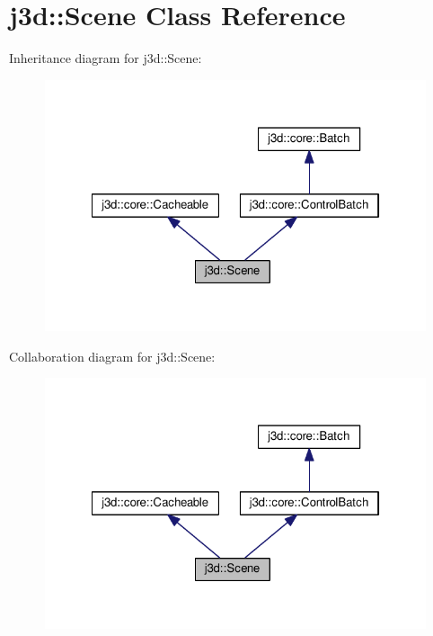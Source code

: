 \hypertarget{classj3d_1_1Scene}{}\section{j3d\+:\+:Scene Class Reference}
\label{classj3d_1_1Scene}


Inheritance diagram for j3d\+:\+:Scene\+:
\nopagebreak
\begin{figure}[H]
\begin{center}
\leavevmode
\includegraphics[width=322pt]{classj3d_1_1Scene__inherit__graph}
\end{center}
\end{figure}


Collaboration diagram for j3d\+:\+:Scene\+:
\nopagebreak
\begin{figure}[H]
\begin{center}
\leavevmode
\includegraphics[width=322pt]{classj3d_1_1Scene__coll__graph}
\end{center}
\end{figure}
